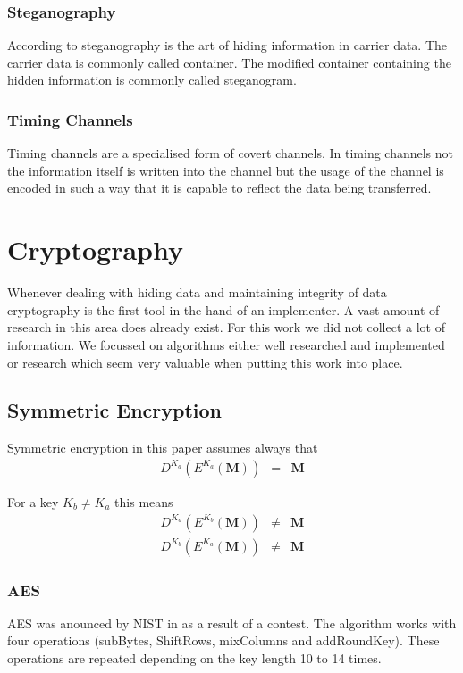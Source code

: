 \subsubsection{Steganography}
According to \cite{wiki:steganographie} steganography is the art of hiding information in carrier data. The carrier data is commonly called container. The modified container containing the hidden information is commonly called steganogram.


\subsubsection{Timing Channels}
Timing channels are a specialised form of covert channels. In timing channels not the information itself is written into the channel but the usage of the channel is encoded in such a way that it is capable to reflect the data being transferred.


\section{Cryptography}
Whenever dealing with hiding data and maintaining integrity of data cryptography is the first tool in the hand of an implementer. A vast amount of research in this area does already exist. For this work we did not collect a lot of information. We focussed on algorithms either well researched and implemented or research which seem very valuable when putting this work into place. 

\subsection{Symmetric Encryption}
Symmetric encryption in this paper assumes always that
\begin{eqnarray}
	D^{K_a}\left(E^{K_a}\left(\mathbf{M}\right)\right) & = & \mathbf{M}
\end{eqnarray} 

For a key $K_b\neq K_a$ this means
\begin{eqnarray}
	D^{K_a}\left(E^{K_b}\left(\mathbf{M}\right)\right) & \neq & \mathbf{M}\\
	D^{K_b}\left(E^{K_a}\left(\mathbf{M}\right)\right) & \neq & \mathbf{M}
\end{eqnarray} 

\subsubsection{AES}
AES was anounced by NIST in \citeyear{standard2001announcing} as a result of a contest. The algorithm works with four operations (subBytes, ShiftRows, mixColumns and addRoundKey). These operations are repeated depending on the key length 10 to 14 times. 

